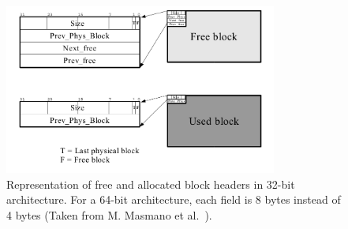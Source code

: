 \begin{figure}[h]
    \centering
    \includegraphics[width=0.80\textwidth]{figures/blockheader_reference.png}
    \caption{Representation of free and allocated block headers in 32-bit architecture. For a 64-bit architecture, each field is 8 bytes instead of 4 bytes (Taken from M. Masmano et al.~\cite{TLSF}).}
    \label{fig:blockheader_reference}
\end{figure}

